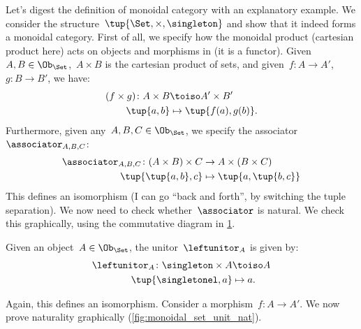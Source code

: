 \begin{example}
  Let's digest the definition of monoidal category with an explanatory example. We consider the structure~$\tup{\Set,\times,\singleton}$ and show that it indeed forms a monoidal category. First of all, we specify how the monoidal product (cartesian product here) acts on objects and morphisms in \Set (it is a functor). Given~$A,B\in \Ob_{\Set}$,~$A\times B$ is the cartesian product of sets, and given~$f\colon A\to A'$,~$g\colon B\to B'$, we have:
  \begin{equation*}
    \begin{aligned}
    (f\times g)
      \colon A\times B&\toiso A'\times B'\\
      \tup{a,b}&\mapsto \tup{f(a),g(b)}.
    \end{aligned}
  \end{equation*}
  Furthermore, given any~$A,B,C\in \Ob_{\Set}$, we specify the associator~$\associator_{A,B,C}$:
  \begin{equation*}
    \begin{aligned}
      \associator_{A,B,C}\colon (A\times B)\times C&\to A\times (B\times C)\\
      \tup{\tup{a,b},c}&\mapsto \tup{a,\tup{b,c}}
    \end{aligned}
  \end{equation*}
  This defines an isomorphism (I can go ``back and forth'', by switching the tuple separation). We now need to check whether~$\associator$ is natural. We check this graphically, using the commutative diagram in \cref{fig:monoidal_set_ass_nat}.

  \begin{figure}[h!]
    \begin{center}
    \end{center}
    \caption{\label{fig:monoidal_set_ass_nat}}
  \end{figure}

  Given an object~$A\in \Ob_\Set$, the unitor~$\leftunitor_A$ is given by:
  \begin{equation*}
    \begin{aligned}
      \leftunitor_A\colon \singleton \times A &\toiso A\\
      \tup{\singletonel,a}&\mapsto a.
    \end{aligned}
  \end{equation*}

  Again, this defines an isomorphism. Consider a morphism~$f\colon A\to A'$. We now prove naturality graphically (\cref{fig:monoidal_set_unit_nat}).


\end{example}
